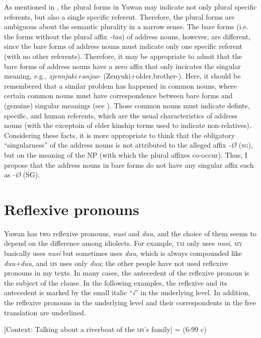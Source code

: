   As mentioned in , the plural forms in Yuwan may indicate not only plural specific referents, but also a single specific referent. Therefore, the plural forms are ambiguous about the semantic plurality in a narrow sense. The bare forms (i.e. the forms without the plural affix \textit{{}-taa}) of address nouns, however, are different, since the bare forms of address nouns must indicate only one specific referent (with no other referents). Therefore, it may be appropriate to admit that the bare forms of address nouns have a zero affix that only incicates the singular meaning, e.g., \textit{zjennjuki+anjoo-} (Zenyuki+older.brother-\textsc{}). Here, it should be remembered that a similar problem has happened in common nouns, where certain common nouns must have correspondence between bare forms and (genuine) singular meanings (see ). Those common nouns must indicate definte, specific, and human referents, which are the usual characteristics of address nouns (with the exceptoin of elder kinship terms used to indicate non-relatives). Considering these facts, it is more appropriate to think that the obligatory “singularness” of the address nouns is not attributed to the alleged affix \textit{{}-Ø} (\textsc{sg}), but on the meaning of the NP (with which the plural affixes co-occur). Thus, I propose that the address nouns in bare forms do not have any singular affix such as \textit{{}-Ø} (SG).

\section{Reflexive pronouns}

Yuwan has two reflexive pronouns, \textit{nusi} and \textit{duu}, and the choice of them seems to depend on the difference among idiolects. For example, \textsc{tm} only uses \textit{nusi}, \textsc{my} basically uses \textit{nusi} but sometimes uses \textit{duu}, which is always compounded like \textit{duu+duu}, and \textsc{ms} uses only \textit{duu}; the other people have not used reflexive pronouns in my texts. In many cases, the antecedent of the reflexive pronoun is the subject of the clause. In the following examples, the reflexive and its antecedent is marked by the small italic “\textit{i}” in the underlying level. In addition, the reflexive pronouns in the underlying level and their correspondents in the free translation are underlined.

\ea \label{ex:7:7}  
\ea\label{ex:7:7a}  [Context: Talking about a riverboat of the \textsc{ms}’s family] = (6-99 c)

